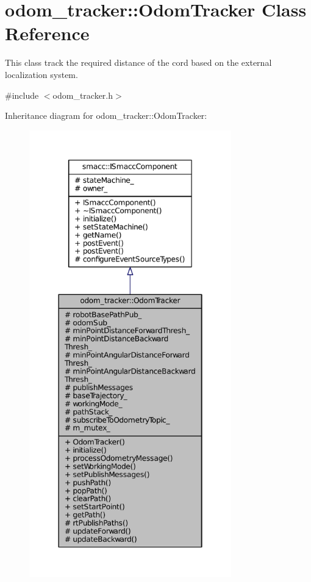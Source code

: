\hypertarget{classodom__tracker_1_1OdomTracker}{}\section{odom\+\_\+tracker\+:\+:Odom\+Tracker Class Reference}
\label{classodom__tracker_1_1OdomTracker}


This class track the required distance of the cord based on the external localization system.  




{\ttfamily \#include $<$odom\+\_\+tracker.\+h$>$}



Inheritance diagram for odom\+\_\+tracker\+:\+:Odom\+Tracker\+:
\nopagebreak
\begin{figure}[H]
\begin{center}
\leavevmode
\includegraphics[height=550pt]{classodom__tracker_1_1OdomTracker__inherit__graph}
\end{center}
\end{figure}


